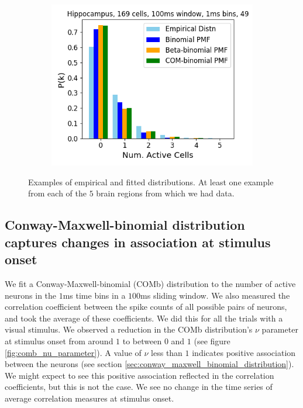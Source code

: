 \begin{figure}[p]
      \begin{subfigure}[h]{0.5\linewidth}
        \includegraphics[width=\linewidth]{figures/conway_maxwell/hippocampus_1ms_trial_49_example.png}
        \label{fig:hippocampus_1ms_trial_49_example}
      \end{subfigure}
      \caption{Examples of empirical and fitted distributions. At least one example from each of the $5$ brain regions from which we had data.}
      \label{fig:fitted_examples_bar}
    \end{figure}

  \subsection{Conway-Maxwell-binomial distribution captures changes in association at stimulus onset}
  We fit a Conway-Maxwell-binomial (COMb) distribution to the number of active neurons in the $1$ms time bins in a $100$ms sliding window. We also measured the correlation coefficient between the spike counts of all possible pairs of neurons, and took the average of these coefficients. We did this for all the trials with a visual stimulus. We observed a reduction in the COMb distribution's $\nu$ parameter at stimulus onset from around $1$ to between $0$ and $1$ (see figure \ref{fig:comb_nu_parameter}). A value of $\nu$ less than $1$ indicates positive association between the neurons (see section \ref{sec:conway_maxwell_binomial_distribution}). We might expect to see this positive association reflected in the correlation coefficients, but this is not the case. We see no change in the time series of average correlation measures at stimulus onset.

